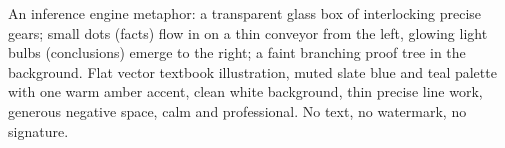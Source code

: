 An inference engine metaphor: a transparent glass box of interlocking precise gears; small dots (facts) flow in on a thin conveyor from the left, glowing light bulbs (conclusions) emerge to the right; a faint branching proof tree in the background. Flat vector textbook illustration, muted slate blue and teal palette with one warm amber accent, clean white background, thin precise line work, generous negative space, calm and professional. No text, no watermark, no signature.
